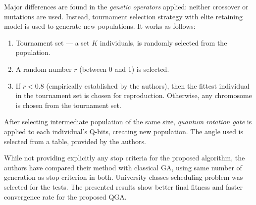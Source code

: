 \documentclass[../ThesisDoc]{subfiles}
\begin{document}
\medskip\noindent
Major differences are found in the \emph{genetic operators} applied:
neither crossover or mutations are used. Instead, tournament selection strategy
with elite retaining model is used to generate new populations.
It works as follows:
\begin{enumerate}
  \item Tournament set --- a set $K$ individuals, is randomly selected from
        the population.
  \item A random number $r$ (between 0 and 1) is selected.
  \item If $r < 0.8$ (empirically established by the authors), then the fittest
        individual in the tournament set is chosen for reproduction.
        Otherwise, any chromosome is chosen from the tournament set.
\end{enumerate}
\noindent
After selecting intermediate population of the same size, \emph{quantum rotation gate}
is applied to each individual's Q-bits, creating new population.
The angle used is selected from a table, provided by the authors.

While not providing explicitly any stop criteria for the proposed algorithm,
the authors have compared their method with classical GA, using same number
of generation as stop criterion in both.
University classes scheduling problem was selected for the tests.
The presented results show better final fitness and faster convergence rate for
the proposed QGA.
\end{document}
